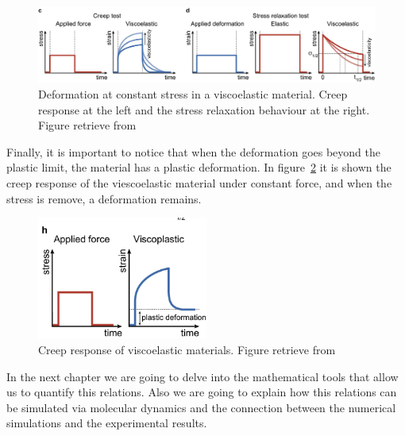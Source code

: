 \begin{figure}[ht!]
    \centering
    \centering
    \includegraphics[width=\textwidth]{figs/mechResponse/0-b.png}
    \caption{Deformation at constant stress in a viscoelastic material.
        Creep response at the left and the stress relaxation behaviour at the right.
        Figure retrieve from\citep{courbotRoleExtracellularMatrix2025}}\label{fig:mechresponse0-b}
\end{figure}

Finally, it is important to notice that when the deformation goes beyond the plastic limit, the material has a plastic deformation.
In figure~\ref{fig:mechresponse0-c} it is shown the creep response of the viescoelastic material under constant force, and when the stress is remove, a deformation remains.

\begin{figure}[ht!]
    \centering
    \centering
    \includegraphics[width=0.5\textwidth]{figs/mechResponse/0-c.png}
    \caption{Creep response of viscoelastic materials. 
        Figure retrieve from\citep{courbotRoleExtracellularMatrix2025}}\label{fig:mechresponse0-c}
\end{figure}

In the next chapter we are going to delve into the mathematical tools that allow us to quantify this relations.
Also we are going to explain how this relations can be simulated via molecular dynamics and the connection between the numerical simulations and the experimental results.

